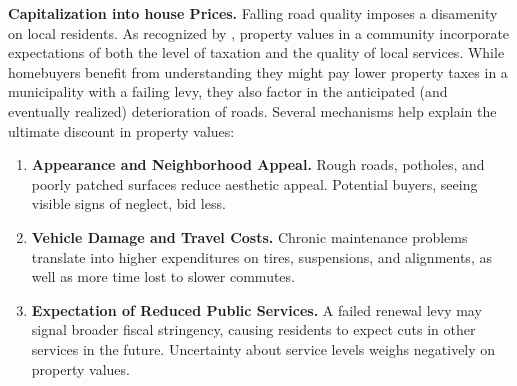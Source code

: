{\bf Capitalization into house Prices.} Falling road quality imposes a disamenity on local residents. As recognized by \cite{Oates1969}, property values in a community incorporate expectations of both the level of taxation and the quality of local services. While homebuyers benefit from understanding they might pay lower property taxes in a municipality with a failing levy, they also factor in the anticipated (and eventually realized) deterioration of roads. Several mechanisms help explain the ultimate discount in property values:

\begin{enumerate}
    \item \textbf{Appearance and Neighborhood Appeal.} Rough roads, potholes, and poorly patched surfaces reduce aesthetic appeal. Potential buyers, seeing visible signs of neglect, bid less.
    \item \textbf{Vehicle Damage and Travel Costs.} Chronic maintenance problems translate into higher expenditures on tires, suspensions, and alignments, as well as more time lost to slower commutes.
    \item \textbf{Expectation of Reduced Public Services.} A failed renewal levy may signal broader fiscal stringency, causing residents to expect cuts in other services in the future. Uncertainty about service levels weighs negatively on property values. 
\end{enumerate}


